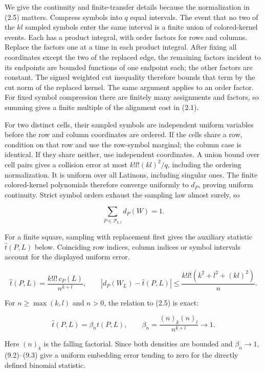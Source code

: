 \documentclass[english,11pt,a4paper]{article}
\begin{document}
We give the continuity and finite-transfer details because the normalization in (2.5) matters. Compress symbols into \(q\) equal intervals. The event that no two of the \(kl\) sampled symbols enter the same interval is a finite union of colored-kernel events. Each has a product integral, with order factors for rows and columns. Replace the factors one at a time in each product integral. After fixing all coordinates except the two of the replaced edge, the remaining factors incident to its endpoints are bounded functions of one endpoint each; the other factors are constant. The signed weighted cut inequality therefore bounds that term by the cut norm of the replaced kernel. The same argument applies to an order factor. For fixed symbol compression there are finitely many assignments and factors, so summing gives a finite multiple of the alignment cost in (2.1).

For two distinct cells, their sampled symbols are independent uniform variables before the row and column coordinates are ordered. If the cells share a row, condition on that row and use the row-symbol marginal; the column case is identical. If they share neither, use independent coordinates. A union bound over cell pairs gives a collision error at most \(k!l!(kl)^2/q\), including the ordering normalization. It is uniform over all Latinons, including singular ones. The finite colored-kernel polynomials therefore converge uniformly to \(d_P\), proving uniform continuity. Strict symbol orders exhaust the sampling law almost surely, so

\nopagebreak[4]
\[\sum_{P\in\mathcal P_{k,l}}d_P(W)=1.\tag{9.1}\]

For a finite square, sampling with replacement first gives the auxiliary statistic \(\widehat t(P,L)\) below. Coinciding row indices, column indices or symbol intervals account for the displayed uniform error.

\nopagebreak[4]
\[\widehat t(P,L)=\frac{k!l!\,c_P(L)}{n^{k+l}},\qquad
|d_P(W_L)-\widehat t(P,L)|\le\frac{k!l!(k^2+l^2+(kl)^2)}n.\tag{9.2}\]

For \(n\ge\max(k,l)\) and \(n>0\), the relation to (2.5) is exact:

\nopagebreak[4]
\[\widehat t(P,L)=\beta_n t(P,L),\qquad
\beta_n=\frac{(n)_k(n)_l}{n^{k+l}}\longrightarrow1.\tag{9.3}\]

Here \((n)_k\) is the falling factorial. Since both densities are bounded and \(\beta_n\to1\), (9.2)--(9.3) give a uniform embedding error tending to zero for the directly defined binomial statistic.
\end{document}
